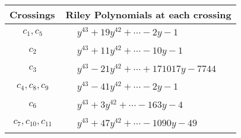 \documentclass[1p]{elsarticle_modified}
\theoremstyle{definition}
\begin{document}
\begin{tabular}{m{50pt}|m{274pt}}
Crossings & \hspace{64pt}Riley Polynomials at each crossing \\
\hline $$\begin{aligned}c_{1},c_{5}\end{aligned}$$&$\begin{aligned}
&y^{43}+19 y^{42}+\cdots-2 y-1
\end{aligned}$\\
\hline $$\begin{aligned}c_{2}\end{aligned}$$&$\begin{aligned}
&y^{43}+11 y^{42}+\cdots-10 y-1
\end{aligned}$\\
\hline $$\begin{aligned}c_{3}\end{aligned}$$&$\begin{aligned}
&y^{43}-21 y^{42}+\cdots+171017 y-7744
\end{aligned}$\\
\hline $$\begin{aligned}c_{4},c_{8},c_{9}\end{aligned}$$&$\begin{aligned}
&y^{43}-41 y^{42}+\cdots-2 y-1
\end{aligned}$\\
\hline $$\begin{aligned}c_{6}\end{aligned}$$&$\begin{aligned}
&y^{43}+3 y^{42}+\cdots-163 y-4
\end{aligned}$\\
\hline $$\begin{aligned}c_{7},c_{10},c_{11}\end{aligned}$$&$\begin{aligned}
&y^{43}+47 y^{42}+\cdots-1090 y-49
\end{aligned}$\\
\hline
\end{tabular}
\vskip 2pc
\end{document}

